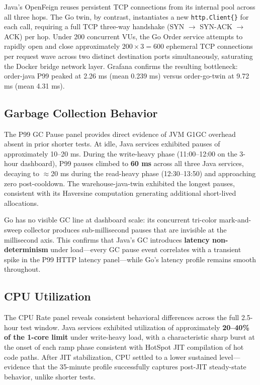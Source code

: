 \documentclass[conference]{IEEEtran}
\begin{document}
Java's OpenFeign reuses persistent TCP connections from its internal pool across all three hops. The Go twin, by contrast, instantiates a new \texttt{http.Client\{\}} for each call, requiring a full TCP three-way handshake (SYN $\rightarrow$ SYN-ACK $\rightarrow$ ACK) per hop. Under 200 concurrent VUs, the Go Order service attempts to rapidly open and close approximately $200 \times 3 = 600$ ephemeral TCP connections per request wave across two distinct destination ports simultaneously, saturating the Docker bridge network layer. Grafana confirms the resulting bottleneck: order-java P99 peaked at 2.26 ms (mean 0.239 ms) versus order-go-twin at 9.72 ms (mean 4.31 ms).

\subsection{Garbage Collection Behavior}

The P99 GC Pause panel provides direct evidence of JVM G1GC overhead absent in prior shorter tests. At idle, Java services exhibited pauses of approximately 10--20 ms. During the write-heavy phase (11:00--12:00 on the 3-hour dashboard), P99 pauses climbed to \textbf{60 ms} across all three Java services, decaying to $\approx$20 ms during the read-heavy phase (12:30--13:50) and approaching zero post-cooldown. The warehouse-java-twin exhibited the longest pauses, consistent with its Haversine computation generating additional short-lived allocations.

Go has no visible GC line at dashboard scale: its concurrent tri-color mark-and-sweep collector produces sub-millisecond pauses that are invisible at the millisecond axis. This confirms that Java's GC introduces \textbf{latency non-determinism} under load---every GC pause event correlates with a transient spike in the P99 HTTP latency panel---while Go's latency profile remains smooth throughout.

\subsection{CPU Utilization}

The CPU Rate panel reveals consistent behavioral differences across the full 2.5-hour test window. Java services exhibited utilization of approximately \textbf{20--40\% of the 1-core limit} under write-heavy load, with a characteristic sharp burst at the onset of each ramp phase consistent with HotSpot JIT compilation of hot code paths. After JIT stabilization, CPU settled to a lower sustained level---evidence that the 35-minute profile successfully captures post-JIT steady-state behavior, unlike shorter tests.
\end{document}
